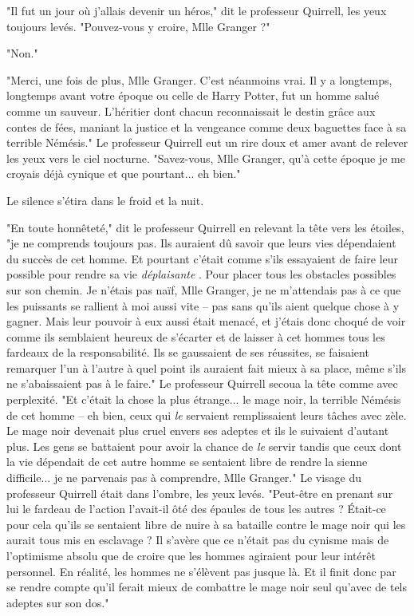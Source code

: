 "Il fut un jour où j'allais devenir un héros," dit le professeur Quirrell, les yeux toujours levés. "Pouvez-vous y croire, Mlle Granger ?"

"Non."

"Merci, une fois de plus, Mlle Granger. C'est néanmoins vrai. Il y a longtemps, longtemps avant votre époque ou celle de Harry Potter, fut un homme salué comme un sauveur. L'héritier dont chacun reconnaissait le destin grâce aux contes de fées, maniant la justice et la vengeance comme deux baguettes face à sa terrible Némésis." Le professeur Quirrell eut un rire doux et amer avant de relever les yeux vers le ciel nocturne. "Savez-vous, Mlle Granger, qu'à cette époque je me croyais déjà cynique et que pourtant... eh bien."

Le silence s'étira dans le froid et la nuit.

"En toute honnêteté," dit le professeur Quirrell en relevant la tête vers les étoiles, "je ne comprends toujours pas. Ils auraient dû savoir que leurs vies dépendaient du succès de cet homme. Et pourtant c'était comme s'ils essayaient de faire leur possible pour rendre sa vie \emph{déplaisante} . Pour placer tous les obstacles possibles sur son chemin. Je n'étais pas naïf, Mlle Granger, je ne m'attendais pas à ce que les puissants se rallient à moi aussi vite – pas sans qu'ils aient quelque chose à y gagner. Mais leur pouvoir à eux aussi était menacé, et j'étais donc choqué de voir comme ils semblaient heureux de s'écarter et de laisser à cet hommes tous les fardeaux de la responsabilité. Ils se gaussaient de ses réussites, se faisaient remarquer l'un à l'autre à quel point ils auraient fait mieux à sa place, même s'ils ne s'abaissaient pas à le faire." Le professeur Quirrell secoua la tête comme avec perplexité. "Et c'était la chose la plus étrange... le mage noir, la terrible Némésis de cet homme – eh bien, ceux qui \emph{le}  servaient remplissaient leurs tâches avec zèle. Le mage noir devenait plus cruel envers ses adeptes et ils le suivaient d'autant plus. Les gens se battaient pour avoir la chance de \emph{le}  servir tandis que ceux dont la vie dépendait de cet autre homme se sentaient libre de rendre la sienne difficile... je ne parvenais pas à comprendre, Mlle Granger." Le visage du professeur Quirrell était dans l'ombre, les yeux levés. "Peut-être en prenant sur lui le fardeau de l'action l'avait-il ôté des épaules de tous les autres ? Était-ce pour cela qu'ils se sentaient libre de nuire à sa bataille contre le mage noir qui les aurait tous mis en esclavage ? Il s'avère que ce n'était pas du cynisme mais de l'optimisme absolu que de croire que les hommes agiraient pour leur intérêt personnel. En réalité, les hommes ne s'élèvent pas jusque là. Et il finit donc par se rendre compte qu'il ferait mieux de combattre le mage noir seul qu'avec de tels adeptes sur son dos."

